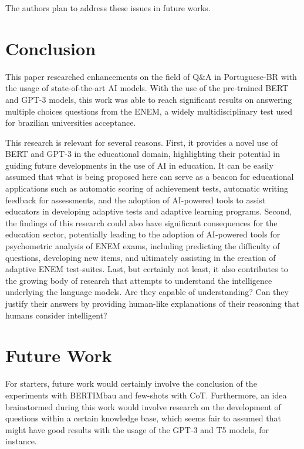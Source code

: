 \documentclass{article}
\begin{document}
The authors plan to address these issues in future works.

\section{Conclusion}


This paper researched enhancements on the field of Q\&A in Portuguese-BR with the usage of state-of-the-art AI models. With the use of the pre-trained BERT and GPT-3 models, this work was able to reach significant results on answering multiple choices questions from the ENEM, a widely multidisciplinary test used for brazilian universities acceptance.

This research is relevant for several reasons. First, it provides a novel use of BERT and GPT-3 in the educational domain, highlighting their potential in guiding future developments in the use of AI in education. It can be easily assumed that what is being proposed here can serve as a beacon for educational applications such as automatic scoring of achievement tests, automatic writing feedback for assessments, and the adoption of AI-powered tools to assist educators in developing adaptive tests and adaptive learning programs. Second, the findings of this research could also have significant consequences for the education sector, potentially leading to the adoption of AI-powered tools for psychometric analysis of ENEM exams, including predicting the difficulty of questions, developing new items, and ultimately assisting in the creation of adaptive ENEM test-suites. Last, but certainly not least, it also contributes to the growing body of research that attempts to understand the intelligence underlying the language models. Are they capable of understanding? Can they justify their answers by providing human-like explanations of their reasoning that humans consider intelligent?

\section{Future Work}

For starters, future work would certainly involve the conclusion of the experiments with BERTIMbau and few-shots with CoT. Furthermore, an idea brainstormed during this work would involve research on the development of questions within a certain knowledge base, which seems fair to assumed that might have good results with the usage of the GPT-3 and T5 models, for instance.



\end{document}
